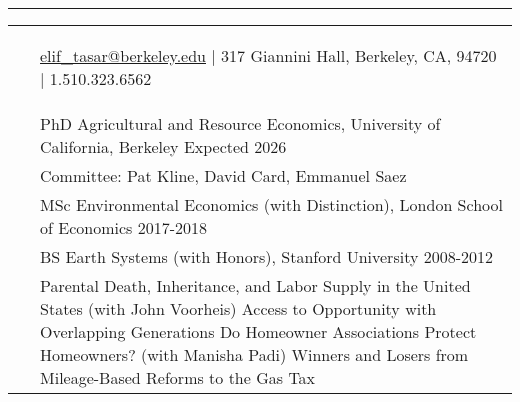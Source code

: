 \documentclass[letterpaper,10pt,oneside]{article}
\newenvironment{myresume}[2]{\pdfbookmark{#1}{#1}{\LARGE{\textbf{#1}}}\vspace{1mm}\hrule\vspace{-2mm}\begin{longtable}{p{0.12\textwidth} p{0.8\textwidth}}&#2}{\end{longtable}}
\renewcommand{\section}[2]{\vspace{-1.5em}\\\pdfbookmark{#1}{#2}{\singlespace\textsc{#1}}&}
\newcommand{\firstentry}[1]{\vspace{0em}\newline#1\vspace{0em}}
\newcommand{\entry}[1]{\vspace{-1em}\\~&#1}
\begin{document}

\begin{myresume}{}
\smallskip
\begin{center}
    \vspace{-2em}\hspace{-7em} \href{mailto: elif_tasar@berkeley.edu}{elif\_tasar@berkeley.edu} $\vert$ 317 Giannini Hall, Berkeley, CA, 94720 $\vert$ 1.510.323.6562 \vspace{-2em}
\end{center}

\bigskip
\bigskip


\section{Education}{education}

\firstentry{
PhD Agricultural and Resource Economics, University of California, Berkeley \hfill Expected 2026
}

\entry{Committee: Pat Kline, David Card, Emmanuel Saez}

\entry{MSc Environmental Economics (with Distinction), London School of Economics \hfill 2017-2018
}

\entry{
BS Earth Systems (with Honors), Stanford University \hfill 2008-2012
}


\section{Working \newline Papers}{wps}
\firstentry{[1] Parental Death, Inheritance, and Labor Supply in the United States (with John Voorheis)
\newline [2] Access to Opportunity with Overlapping Generations 
\newline [3] Do Homeowner Associations Protect Homeowners? (with Manisha Padi)
\newline [4] Winners and Losers from Mileage-Based Reforms to the Gas Tax
}

\vspace{1.5em}



\end{myresume}
\end{document}
